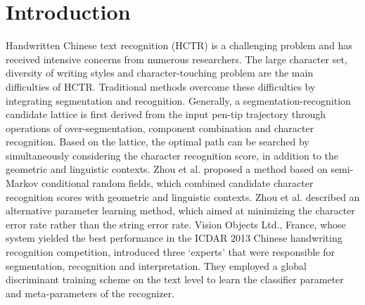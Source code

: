 \documentclass[10pt,conference,a4paper]{IEEEtran}
\begin{document}




%
\IEEEpeerreviewmaketitle



\section{Introduction}
Handwritten Chinese text recognition (HCTR) is a challenging problem and has received intensive concerns from numerous researchers.
The large character set, diversity of writing styles and character-touching problem are the main difficulties of HCTR.
Traditional methods\cite{zhou2013handwritten}\cite{zhou2014minimum} overcome these difficulties by integrating segmentation and recognition.
Generally, a segmentation-recognition candidate lattice\cite{zhou2013handwritten} is first derived from the input pen-tip trajectory through operations of over-segmentation, component combination and character recognition.
Based on the lattice, the optimal path can be searched by simultaneously considering the character recognition score, in addition to the geometric and linguistic contexts.
Zhou et al.\cite{zhou2013handwritten} proposed a method based on semi-Markov conditional random fields, which combined candidate character recognition scores with geometric and linguistic contexts.
Zhou et al.\cite{zhou2014minimum} described an alternative parameter learning method, which aimed at minimizing the character error rate rather than the string error rate.
Vision Objects Ltd., France, whose system yielded the best performance in the ICDAR 2013 Chinese handwriting recognition competition\cite{yin2013icdar}, introduced three `experts' that were responsible for segmentation, recognition and interpretation.
They employed a global discriminant training scheme on the text level to learn the classifier parameter and meta-parameters of the recognizer.
\end{document}
